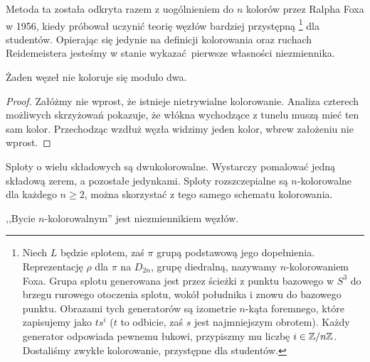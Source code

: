 Metoda ta została odkryta razem z uogólnieniem do $n$ kolorów przez Ralpha Foxa w 1956, kiedy próbował uczynić teorię węzłów bardziej przystępną
\footnote{
	Niech $L$ będzie splotem, zaś $\pi$ grupą podstawową jego dopełnienia.
	Reprezentację $\rho$ dla $\pi$ na $D_{2n}$, grupę diedralną, nazywamy $n$-kolorowaniem Foxa.
	Grupa splotu generowana jest przez ścieżki z punktu bazowego w $S^3$ do brzegu rurowego otoczenia splotu, wokół południka i znowu do bazowego punktu.
	Obrazami tych generatorów są izometrie $n$-kąta foremnego, które zapisujemy jako $ts^i$ ($t$ to odbicie, zaś $s$ jest najmniejszym obrotem).
	Każdy generator odpowiada pewnemu łukowi, przypiszmy mu liczbę $i \in \mathbb Z/n\mathbb Z$.
	Dostaliśmy zwykłe kolorowanie, przystępne dla studentów.
}
dla studentów.
Opierając się jedynie na definicji kolorowania oraz ruchach Reidemeistera jesteśmy w stanie wykazać pierwsze własności niezmiennika.

\begin{proposition}
	Żaden węzeł nie koloruje się modulo dwa.
\end{proposition}

\begin{proof}
	Załóżmy nie wprost, że istnieje nietrywialne kolorowanie.
	Analiza czterech możliwych skrzyżowań pokazuje,
	że włókna wychodzące z tunelu muszą mieć ten sam kolor.
	Przechodząc wzdłuż węzła widzimy jeden kolor, wbrew założeniu nie wprost.
\end{proof}

Sploty o wielu składowych są dwukolorowalne.
Wystarczy pomalować jedną składową zerem, a pozostałe jedynkami.
Sploty rozszczepialne są $n$-kolorowalne dla każdego $n \ge 2$, można skorzystać z tego samego schematu kolorowania.

\begin{proposition} \label{color_invariant}
	,,Bycie $n$-kolorowalnym'' jest niezmiennikiem węzłów.
\end{proposition}

